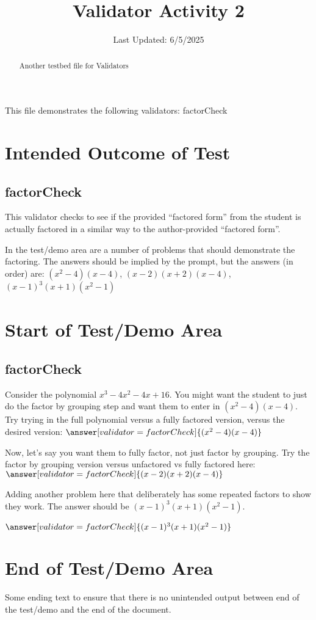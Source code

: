 \documentclass{ximera}
\title{Validator Activity 2}
\date{Last Updated: 6/5/2025}
\begin{document}
\begin{abstract}
    Another testbed file for Validators
\end{abstract}
\maketitle

This file demonstrates the following validators: factorCheck

\section{Intended Outcome of Test}
    \subsection*{factorCheck}
        This validator checks to see if the provided ``factored form'' from the student 
        is actually factored in a similar way to the author-provided ``factored form''.
        
        In the test/demo area are a number of problems that should demonstrate the factoring. The answers should be implied by the prompt, 
        but the answers (in order) are: $(x^2-4)(x-4)$, $(x-2)(x+2)(x-4)$, $(x-1)^3(x+1)(x^2-1)$

\section{Start of Test/Demo Area}

    \subsection*{factorCheck}
\begin{problem}
    Consider the polynomial $x^3 - 4x^2 - 4x + 16$. You might want the student to just do the factor by grouping step 
    and want them to enter in $(x^2-4)(x-4)$. 
    Try trying in the full polynomial versus a fully factored version, 
    versus the desired version: $\answer[validator=factorCheck]{(x^2-4)(x-4)}$
\end{problem}

\begin{problem}
    Now, let's say you want them to fully factor, not just factor by grouping. 
    Try the factor by grouping version versus unfactored vs fully factored here: $\answer[validator=factorCheck]{(x-2)(x+2)(x-4)}$
\end{problem}
 
\begin{problem}
    Adding another problem here that deliberately has some repeated factors to show they work. 
    The answer should be $(x-1)^3(x+1)(x^2-1)$.
     
    $\answer[validator=factorCheck]{(x-1)^3(x+1)(x^2-1)}$
\end{problem}

\section{End of Test/Demo Area}

Some ending text to ensure that there is no unintended output between end of the test/demo and the end of the document.
\end{document}
